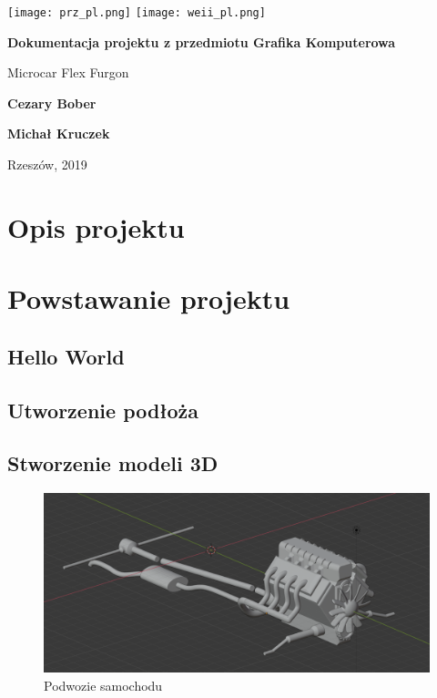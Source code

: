 \documentclass[a4paper,12pt]{article}
\numberwithin{equation}{section}
\begin{document}

\begin{titlepage}
    \texttt{[image: prz\_pl.png]}
    \hfill
    \texttt{[image: weii\_pl.png]}
    
    \centering
    \vfill
    
    {\Huge \textbf{Dokumentacja projektu z przedmiotu Grafika Komputerowa} \par}
	\vspace{1.5cm}
	{\LARGE Microcar Flex Furgon \par}
	
	\vfill
    
    {\Large \textbf{Cezary Bober} \par}
    {\Large \textbf{Michał Kruczek} \par}
    
    \vfill
    
    {\LARGE Rzeszów, 2019\par}
\end{titlepage}

\setlength{\parskip}{0.3cm}
\setlength{\parindent}{1cm}
\setcounter{page}{2}

\tableofcontents
\pagebreak

\section{Opis projektu}

\section{Powstawanie projektu}
\subsection{Hello World}
\subsection{Utworzenie podłoża}

\subsection{Stworzenie modeli 3D}

\begin{figure}[H]
    \centering
    \includegraphics[width=\textwidth]{podwozie.png}
    \caption{Podwozie samochodu}
    \label{fig:podwozie}
\end{figure}
\end{document}

